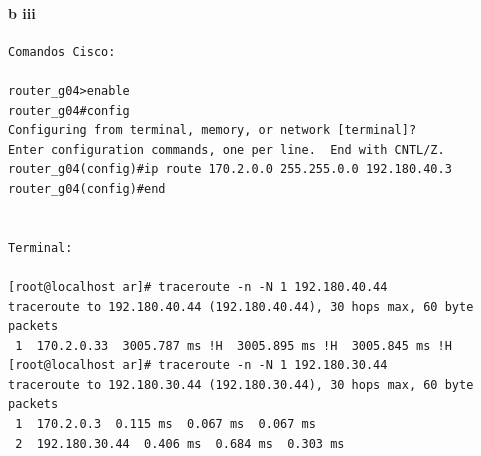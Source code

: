 \paragraph{b iii}
\begin{verbatim}
Comandos Cisco:                                                          
                                                                         
router_g04>enable                                                        
router_g04#config                                                        
Configuring from terminal, memory, or network [terminal]?                
Enter configuration commands, one per line.  End with CNTL/Z.            
router_g04(config)#ip route 170.2.0.0 255.255.0.0 192.180.40.3           
router_g04(config)#end                                                   
                                                                         
                                                                         
Terminal:                                                                
                                                                         
[root@localhost ar]# traceroute -n -N 1 192.180.40.44                    
traceroute to 192.180.40.44 (192.180.40.44), 30 hops max, 60 byte packets
 1  170.2.0.33  3005.787 ms !H  3005.895 ms !H  3005.845 ms !H           
[root@localhost ar]# traceroute -n -N 1 192.180.30.44                    
traceroute to 192.180.30.44 (192.180.30.44), 30 hops max, 60 byte packets
 1  170.2.0.3  0.115 ms  0.067 ms  0.067 ms                              
 2  192.180.30.44  0.406 ms  0.684 ms  0.303 ms                                                                             
\end{verbatim}

